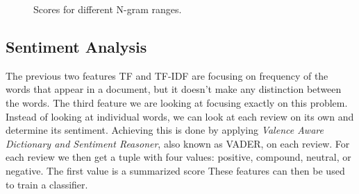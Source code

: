  \begin{figure}[ht!]
    \centering
    \hfill
        \hfill
  \caption{Scores for different N-gram ranges.}
  \label{fig:ngram} 
\end{figure}

\subsection{Sentiment Analysis}
The previous two features TF and TF-IDF are focusing on frequency of the words that appear in a document, but it doesn't make any distinction between the words.
The third feature we are looking at focusing exactly on this problem. Instead of looking at individual words, we can look at each review on its own and determine its sentiment.
Achieving this is done by applying \textit{Valence Aware Dictionary and Sentiment Reasoner}, also known as VADER, on each review.
For each review we then get a tuple with four values: positive, compound, neutral, or negative. The first value is a summarized score These features can then be used to train a classifier. 

